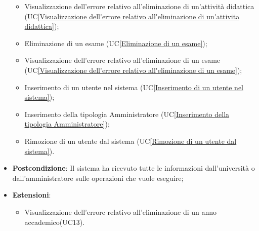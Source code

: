 \begin{itemize}
\begin{itemize}
		\item Visualizzazione dell’errore relativo all’eliminazione di un'attività didattica 
		(UC\ref{Visualizzazione dell'errore relativo all'eliminazione di un'attivita didattica});
		\item Eliminazione di un esame
		(UC\ref{Eliminazione di un esame});
		\item Visualizzazione dell’errore relativo all’eliminazione di un esame
		(UC\ref{Visualizzazione dell'errore relativo all'eliminazione di un esame});
		\item Inserimento di un utente nel sistema
		(UC\ref{Inserimento di un utente nel sistema});
		\item Inserimento della tipologia Amministratore
		(UC\ref{Inserimento della tipologia Amministratore});
		\item Rimozione di un utente dal sistema
		(UC\ref{Rimozione di un utente dal sistema}).
	\end{itemize}
	\item \textbf{Postcondizione}: Il sistema ha ricevuto tutte le informazioni dall'università o dall'amministratore sulle operazioni che vuole eseguire;
	\item \textbf{Estensioni}:
	\begin{itemize}
		\item Visualizzazione dell'errore relativo all'eliminazione di un anno accademico(UC13).
	\end{itemize}
\end{itemize}


